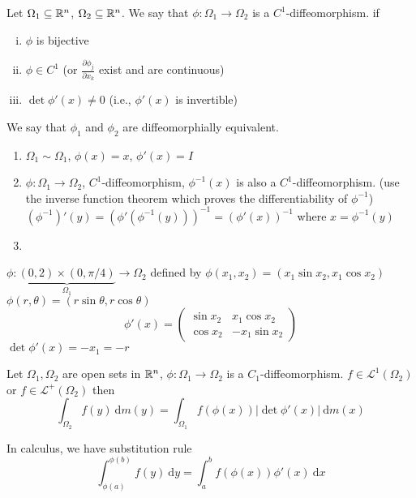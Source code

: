 \begin{definition}
  Let $\Omega_1 \subseteq \mathbb R^n$, $\Omega_2 \subseteq \mathbb R^n$. 
  We say that $\phi: \Omega_1 \to \Omega_2$ is a $C^1$-diffeomorphism.
  if \begin{enumerate}[(i)]
    \item $\phi$ is bijective
    \item $\phi \in C^1$ (or $\frac{\partial \phi_j}{\partial x_k}$ exist and are continuous)
    \item $\det \phi'(x) \neq 0$ (i.e., $\phi'(x)$ is invertible)
  \end{enumerate}
\end{definition}

\begin{remark}
  We say that $\phi_1$ and $\phi_2$ are diffeomorphially equivalent.
  \begin{enumerate}
    \item $\Omega_1 \sim \Omega_1$, $\phi(x) = x$, $\phi'(x) = I$
    \item $\phi: \Omega_1 \to \Omega_2$, $C^1$-diffeomorphism, $\phi^{-1}(x)$ is also a $C^1$-diffeomorphism. 
    (use the inverse function theorem which proves the differentiability of $\phi^{-1}$)
    $(\phi^{-1})'(y) = (\phi'(\phi^{-1}(y)))^{-1} = (\phi'(x))^{-1}$ where $x = \phi^{-1}(y)$
    \item  
  \end{enumerate}
\end{remark}

\begin{example}
  $\phi:\underbrace{(0, 2) \times (0, \pi/4)}_{\Omega_1} \to \Omega_2$ defined by
  $\phi(x_1, x_2) = (x_1 \sin x_2, x_1 \cos x_2)$
  $\phi(r, \theta) = (r\sin \theta, r\cos \theta)$
  \[\phi'(x) = \begin{pmatrix}
    \sin x_2 & x_1 \cos x_2 \\
    \cos x_2 & -x_1 \sin x_2
  \end{pmatrix}\]
  $\det \phi'(x) = -x_1 = -r$
\end{example}

\begin{theorem}
  Let $\Omega_1, \Omega_2$ are open sets in $\mathbb R^n$, $\phi: \Omega_1 \to \Omega_2$ is a $C_1$-diffeomorphism.
  $f \in \mathcal{L}^1(\Omega_2)$ or $f \in \mathcal{L}^+(\Omega_2)$ then 
  \[\int_{\Omega_2} f(y) \ \mathrm{d}m(y) = \int_{\Omega_1} f(\phi(x)) |\det \phi'(x)|\ \mathrm{d}m(x)\]
\end{theorem}

\begin{remark}
  In calculus, we have substitution rule
  \[\int_{\phi(a)}^{\phi(b)} f(y)\ \mathrm{d}y = \int_a^b f(\phi(x))\phi'(x)\ \mathrm{d}x\]
\end{remark}

